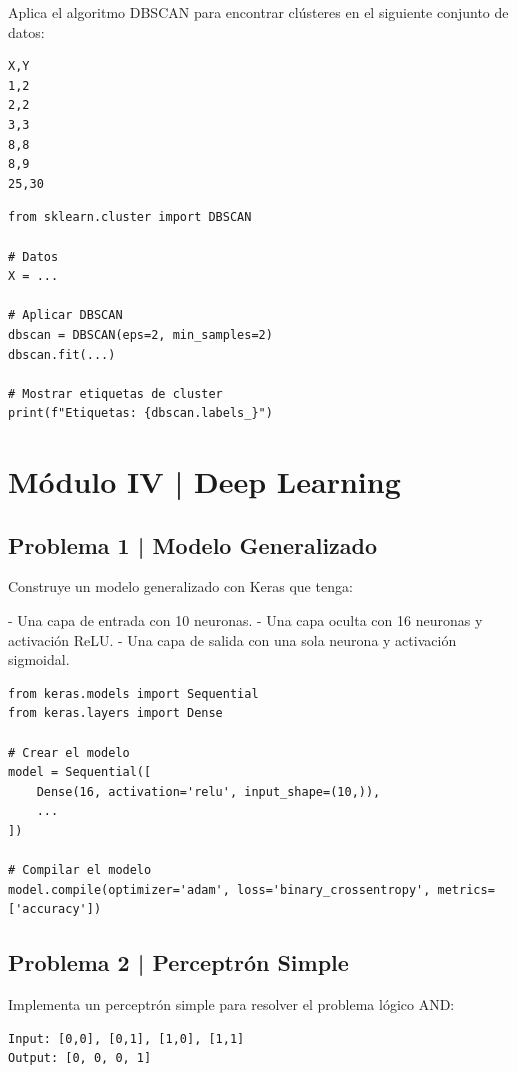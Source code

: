 \documentclass{article}
\begin{document}
Aplica el algoritmo DBSCAN para encontrar clústeres en el siguiente conjunto de datos:

\begin{verbatim}
X,Y
1,2
2,2
3,3
8,8
8,9
25,30
\end{verbatim}

\begin{lstlisting}[style=python]
from sklearn.cluster import DBSCAN

# Datos
X = ...

# Aplicar DBSCAN
dbscan = DBSCAN(eps=2, min_samples=2)
dbscan.fit(...)

# Mostrar etiquetas de cluster
print(f"Etiquetas: {dbscan.labels_}")
\end{lstlisting}

\clearpage

\section*{Módulo IV | Deep Learning}

\subsection*{Problema 1 | Modelo Generalizado}

Construye un modelo generalizado con Keras que tenga:

- Una capa de entrada con 10 neuronas.
- Una capa oculta con 16 neuronas y activación ReLU.
- Una capa de salida con una sola neurona y activación sigmoidal.

\begin{lstlisting}[style=python]
from keras.models import Sequential
from keras.layers import Dense

# Crear el modelo
model = Sequential([
    Dense(16, activation='relu', input_shape=(10,)),
    ...
])

# Compilar el modelo
model.compile(optimizer='adam', loss='binary_crossentropy', metrics=['accuracy'])
\end{lstlisting}

\clearpage

\subsection*{Problema 2 | Perceptrón Simple}

Implementa un perceptrón simple para resolver el problema lógico AND:

\begin{verbatim}
Input: [0,0], [0,1], [1,0], [1,1]
Output: [0, 0, 0, 1]
\end{verbatim}
\end{document}
